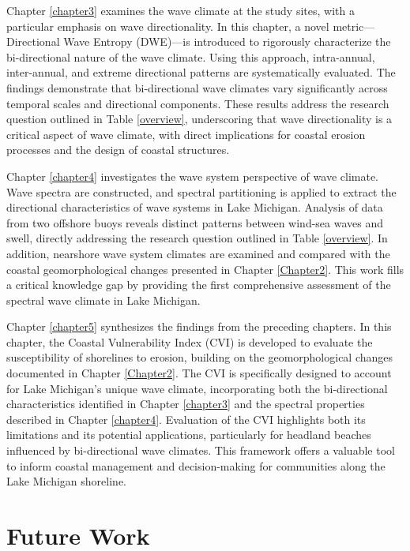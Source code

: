 Chapter \ref{chapter3} examines the wave climate at the study sites, with a
particular emphasis on wave directionality. In this chapter, a novel
metric—Directional Wave Entropy (DWE)—is introduced to rigorously characterize
the bi-directional nature of the wave climate. Using this approach,
intra-annual, inter-annual, and extreme directional patterns are systematically
evaluated. The findings demonstrate that bi-directional wave climates vary
significantly across temporal scales and directional components. These results
address the research question outlined in Table \ref{overview}, underscoring
that wave directionality is a critical aspect of wave climate, with direct
implications for coastal erosion processes and the design of coastal structures.

Chapter \ref{chapter4} investigates the wave system perspective of wave climate.
Wave spectra are constructed, and spectral partitioning is applied to extract
the directional characteristics of wave systems in Lake Michigan. Analysis of
data from two offshore buoys reveals distinct patterns between wind-sea waves
and swell, directly addressing the research question outlined in Table
\ref{overview}. In addition, nearshore wave system climates are examined and
compared with the coastal geomorphological changes presented in Chapter
\ref{Chapter2}. This work fills a critical knowledge gap by providing the first
comprehensive assessment of the spectral wave climate in Lake Michigan.


Chapter \ref{chapter5} synthesizes the findings from the preceding chapters. In
this chapter, the Coastal Vulnerability Index (CVI) is developed to evaluate the
susceptibility of shorelines to erosion, building on the geomorphological
changes documented in Chapter \ref{Chapter2}. The CVI is specifically designed
to account for Lake Michigan’s unique wave climate, incorporating both the
bi-directional characteristics identified in Chapter \ref{chapter3} and the
spectral properties described in Chapter \ref{chapter4}. Evaluation of the CVI
highlights both its limitations and its potential applications, particularly for
headland beaches influenced by bi-directional wave climates. This framework
offers a valuable tool to inform coastal management and decision-making for
communities along the Lake Michigan shoreline.

\section{Future Work}
\label{final_future_work}

